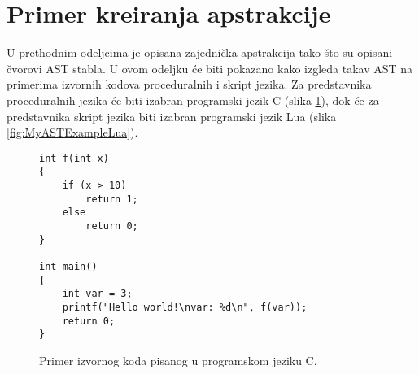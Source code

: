 \section{Primer kreiranja apstrakcije}
\label{sec:MyASTExample}

U prethodnim odeljcima je opisana zajednička apstrakcija tako što su opisani čvorovi AST stabla. U ovom odeljku će biti pokazano kako izgleda takav AST na primerima izvornih kodova proceduralnih i skript jezika. Za predstavnika proceduralnih jezika će biti izabran programski jezik C (slika \ref{fig:MyASTExampleC}), dok će za predstavnika skript jezika biti izabran programski jezik Lua (slika \ref{fig:MyASTExampleLua}).

\begin{figure}[h!]
\begin{lstlisting}
int f(int x) 
{
    if (x > 10)
        return 1;
    else
        return 0;
}

int main() 
{
    int var = 3;
	printf("Hello world!\nvar: %d\n", f(var));
	return 0;
}
\end{lstlisting}
\caption{Primer izvornog koda pisanog u programskom jeziku C.}
\label{fig:MyASTExampleC}
\end{figure}
